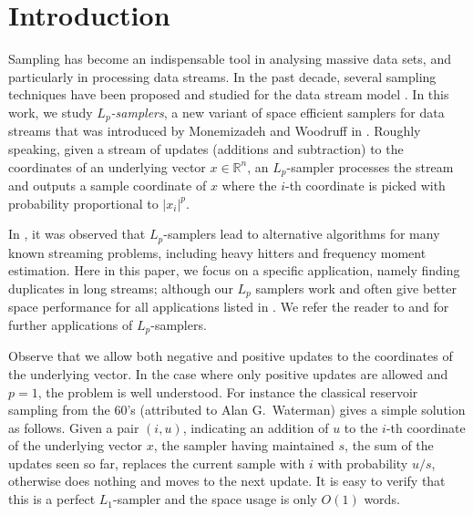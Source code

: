 
\section{Introduction}
\label{sec:intro}
Sampling has become an indispensable tool in analysing massive data sets,
and particularly in processing data streams. In the past decade, 
several sampling techniques have been proposed and studied for the data stream
model \cite{BabcockDM02,DuffieldLT07,BravermanOZ09,CormodeMYZ10,MonemizadehW10,AndoniKO10}.
In this work, we study {\em $L_p$-samplers}, a new variant of
space efficient samplers for data streams that
was introduced by Monemizadeh and
Woodruff in \cite{MonemizadehW10}. 
 Roughly speaking, given a stream of updates (additions and subtraction) 
to the coordinates of an underlying vector $x \in \mathbb R^n$,
an $L_p$-sampler processes the stream and 
outputs a sample coordinate of $x$ where the
$i$-th coordinate is picked with probability proportional to
$|x_i|^p$.

In \cite{MonemizadehW10}, it was observed that $L_p$-samplers lead to 
alternative algorithms for many known streaming problems, including  
heavy hitters and frequency moment estimation. Here in this paper, we
focus on a specific application, namely finding duplicates in long streams;
although our $L_p$ samplers  work and often give better space performance
for all applications listed in \cite{MonemizadehW10}.
We refer the reader to \cite{MonemizadehW10} and \cite{AndoniKO10} 
for further applications of $L_p$-samplers.


Observe that we allow both negative and positive updates to the coordinates of the underlying vector.
In the case where only positive updates are allowed and $p=1$, the problem is well understood.
    For instance the classical reservoir sampling \cite{Knuth69} from the 60's
    (attributed to Alan G.~Waterman) gives a simple 
    solution as follows. Given a pair $(i,u)$, 
    indicating an addition of $u$ to the  $i$-th coordinate of 
    the underlying vector $x$, the sampler having maintained $s$, the sum of the 
    updates seen so far, replaces
     the current sample with $i$ with probability $u/s$, otherwise does nothing 
     and moves to the next update. It is easy to verify that this is a perfect
     $L_1$-sampler and the space usage is only $O(1)$ words.
    
